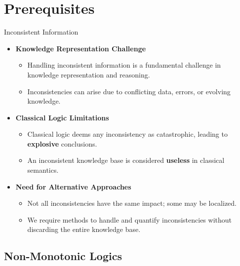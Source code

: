 \section{Prerequisites}

\begin{frame}{Inconsistent Information}
    \begin{itemize}
        \item \textbf{Knowledge Representation Challenge}
              \begin{itemize}
                  \item Handling inconsistent information is a fundamental challenge in knowledge representation and reasoning.
                  \item Inconsistencies can arise due to conflicting data, errors, or evolving knowledge.
              \end{itemize}
        \item \textbf{Classical Logic Limitations}
              \begin{itemize}
                  \item Classical logic deems any inconsistency as catastrophic, leading to \textbf{explosive} conclusions.
                  \item An inconsistent knowledge base is considered \textbf{useless} in classical semantics.
              \end{itemize}
        \item \textbf{Need for Alternative Approaches}
              \begin{itemize}
                  \item Not all inconsistencies have the same impact; some may be localized.
                  \item We require methods to handle and quantify inconsistencies without discarding the entire knowledge base.
              \end{itemize}
    \end{itemize}
\end{frame}

\subsection{Non-Monotonic Logics}

